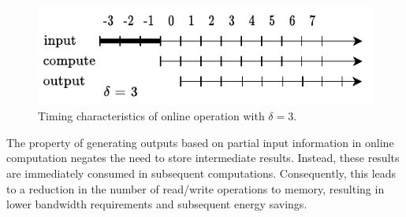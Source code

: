 \documentclass[conference]{IEEEtran}
\begin{document}

\begin{figure}[!ht]
    \centering
    \includegraphics[width=0.75\linewidth]{Online_Timing.pdf}
    \caption{Timing characteristics of online operation with $\delta = 3$.}
    \label{fig:online_op}
\end{figure}

The property of generating outputs based on partial input information in online computation negates the need to store intermediate results. Instead, these results are immediately consumed in subsequent computations. Consequently, this leads to a reduction in the number of read/write operations to memory, resulting in lower bandwidth requirements and subsequent energy savings.
\end{document}
